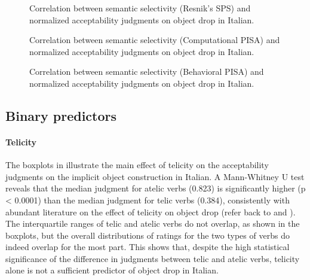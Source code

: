 
\begin{figure}[htb]
\caption{Correlation between semantic selectivity (Resnik's SPS) and normalized acceptability judgments on object drop in Italian.}
    
\end{figure}

\begin{figure}[htb]
\caption{Correlation between semantic selectivity (Computational PISA) and normalized acceptability judgments on object drop in Italian.}
    
\end{figure}

\begin{figure}[htb]
\caption{Correlation between semantic selectivity (Behavioral PISA) and normalized acceptability judgments on object drop in Italian.}
    
\end{figure}


\subsection{Binary predictors} 

\paragraph{Telicity}
The boxplots in  illustrate the main effect of telicity on the acceptability judgments on the implicit object construction in Italian. A Mann-Whitney U test reveals that the median judgment for atelic verbs (0.823) is significantly higher (p < 0.0001) than the median judgment for telic verbs (0.384), consistently with abundant literature on the effect of telicity on object drop (refer back to  and ).\\
The interquartile ranges of telic and atelic verbs do not overlap, as shown in the boxplots, but the overall distributions of ratings for the two types of verbs do indeed overlap for the most part. This shows that, despite the high statistical significance of the difference in judgments between telic and atelic verbs, telicity alone is not a sufficient predictor of object drop in Italian.

